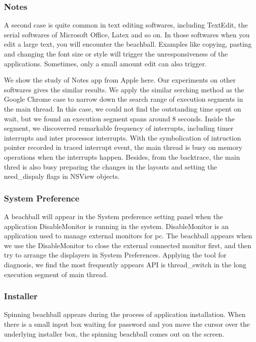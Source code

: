 \subsubsection{Notes}
A second case is quite common in text editing softwares, including TextEdit, the serial softwares of Microsoft Office, Latex and so on. 
In those softwares when you edit a large text, you will encounter the beachball.
Examples like copying, pasting and changing the font size or style will trigger the unresponsiveness of the applications.
Sometimes, only a small amount edit can also trigger.
\par
We show the study of Notes app from Apple here.
Our experiments on other softwares gives the similar results.
We apply the similar serching method as the Google Chrome case to narrow down the search range of execution segments in the main thread.
In this case, we could not find the outstanding time spent on wait, but we found an execution segment spans around 8 seconds.
Inside the segment, we discoverred remarkable frequency of interrupts, including timer interrupts and inter processor interrupts.
With the symbolication of intruction pointer recorded in traced interrupt event, the main thread is busy on memory operations when the interrupts happen. 
Besides, from the backtrace, the main thred is also busy preparing the changes in the layouts and setting the need\_dispaly flags in NSView objects.
\subsubsection{System Preference}
A beachball will appear in the System preference setting panel when the application DisableMonitor is running in the system.
DisableMonitor is an application used to manage external monitors for pc.
The beachball appears when we use the DisableMonitor to close the external connected monitor first, and then try to arrange the displayers in System Preferences.
Applying the tool for diagnosis, we find the most frequently appears API is thread\_switch in the long execution segment of main thread.
\subsubsection{Installer}
Spinning beachball appears during the process of application installation.
When there is a small input box waiting for password and you move the cursor over the underlying installer box, the spinning beachball comes out on the screen.
